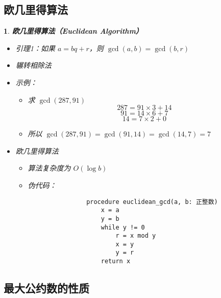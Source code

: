 \documentclass[UTF8]{report}
\theoremstyle{MyLineTheoremStyle} %
\theoremstyle{MyBlockTheoremStyle} %
\theoremstyle{MySubsubsectionStyle} %
\newtheorem{definition}{}
\begin{document}
\subsection{欧几里得算法}

\begin{definition}
    \textbf{欧几里得算法（Euclidean Algorithm）}
    \begin{itemize}
        \item 引理1：如果 $a = bq + r$，则 $\gcd(a, b) = \gcd(b, r)$
        \item 辗转相除法
        \item 示例：
        \begin{itemize}
            \item 求 $\gcd(287, 91)$
            \[
            287 = 91 \times 3 + 14
            \]
            \[
            91 = 14 \times 6 + 7
            \]
            \[
            14 = 7 \times 2 + 0
            \]
            \item 所以 $\gcd(287, 91) = \gcd(91, 14) = \gcd(14, 7) = 7$
        \end{itemize}
        \item 欧几里得算法
        \begin{itemize}
            \item 算法复杂度为 $O(\log b)$
            \item 伪代码：
            \begin{verbatim}
                procedure euclidean_gcd(a, b: 正整数)
                    x = a
                    y = b
                    while y != 0
                        r = x mod y
                        x = y
                        y = r
                    return x
                \end{verbatim}
        \end{itemize}
    \end{itemize}
\end{definition}

\subsection{最大公约数的性质}
\end{document}
